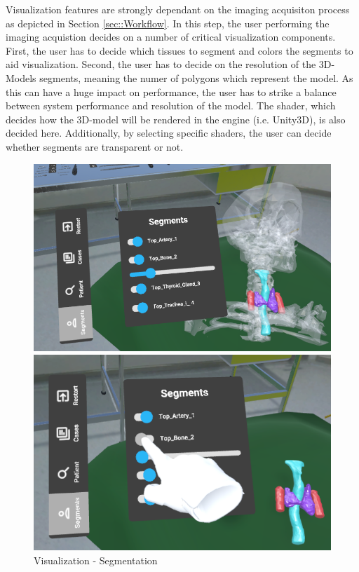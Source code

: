 Visualization features are strongly dependant on the imaging acquisiton process as depicted in Section \ref{sec::Workflow}.
In this step, the user performing the imaging acquistion decides on a number of critical visualization components.
First, the user has to decide which tissues to segment and colors the segments to aid visualization.
Second, the user has to decide on the resolution of the 3D-Models segments, meaning the numer of polygons which represent the model.
As this can have a huge impact on performance, the user has to strike a balance between system performance and resolution of the model.
The shader, which decides how the 3D-model will be rendered in the engine (i.e. Unity3D), is also decided here.
Additionally, by selecting specific shaders, the user can decide whether segments are transparent or not.
\begin{figure}
  \centering
  \begin{minipage}{.5\textwidth}
    \centering
    \includegraphics[width=0.95\linewidth]{images/implementation/features/visualization/segments_1.png}
  \end{minipage}%
  \begin{minipage}{.5\textwidth}
    \centering
    \includegraphics[width=0.915\linewidth]{images/implementation/features/visualization/segments_2.png}
  \end{minipage}
  \caption{\label{fig::Segmentation}Visualization - Segmentation}
\end{figure}


